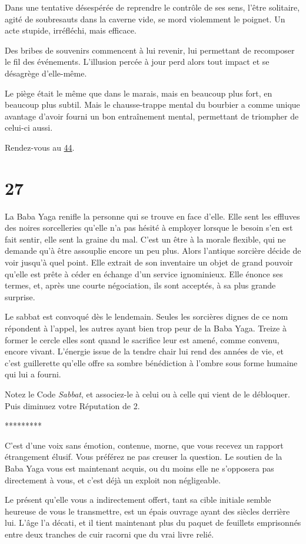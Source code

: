 \documentclass{report}
\newcommand{\gsection}[1]{
    \section{#1}
    \label{section-#1}
}
\newcommand{\glink}[1]{\hyperref[section-#1]{#1}}
\newcommand{\ellipse}{
    \begin{center}
        *********
    \end{center}
}
\begin{document}
Dans une tentative désespérée de reprendre le contrôle de ses sens, l'être solitaire, agité de soubresauts dans la caverne vide, se mord violemment le poignet. Un acte stupide, irréfléchi, mais efficace.

Des bribes de souvenirs commencent à lui revenir, lui permettant de recomposer le fil des événements. L'illusion percée à jour perd alors tout impact et se désagrège d'elle-même.

Le piège était le même que dans le marais, mais en beaucoup plus fort, en beaucoup plus subtil. Mais le chausse-trappe mental du bourbier a comme unique avantage d'avoir fourni un bon entraînement mental, permettant de triompher de celui-ci aussi.

Rendez-vous au \glink{44}.

\gsection{27}

La Baba Yaga renifle la personne qui se trouve en face d'elle. Elle sent les effluves des noires sorcelleries qu'elle n'a pas hésité à employer lorsque le besoin s'en est fait sentir, elle sent la graine du mal. C'est un être à la morale flexible, qui ne demande qu'à être assouplie encore un peu plus. Alors l'antique sorcière décide de voir jusqu'à quel point. Elle extrait de son inventaire un objet de grand pouvoir qu'elle est prête à céder en échange d'un service ignominieux. Elle énonce ses termes, et, après une courte négociation, ils sont acceptés, à sa plus grande surprise.

Le sabbat est convoqué dès le lendemain. Seules les sorcières dignes de ce nom répondent à l'appel, les autres ayant bien trop peur de la Baba Yaga. Treize à former le cercle elles sont quand le sacrifice leur est amené, comme convenu, encore vivant. L'énergie issue de la tendre chair lui rend des années de vie, et c'est guillerette qu'elle offre sa sombre bénédiction à l'ombre sous forme humaine qui lui a fourni.

Notez le Code \emph{Sabbat}, et associez-le à celui ou à celle qui vient de le débloquer. Puis diminuez votre Réputation de 2.

\ellipse

C'est d'une voix sans émotion, contenue, morne, que vous recevez un rapport étrangement élusif. Vous préférez ne pas creuser la question. Le soutien de la Baba Yaga vous est maintenant acquis, ou du moins elle ne s'opposera pas directement à vous, et c'est déjà un exploit non négligeable.

Le présent qu'elle vous a indirectement offert, tant sa cible initiale semble heureuse de vous le transmettre, est un épais ouvrage ayant des siècles derrière lui. L'âge l'a décati, et il tient maintenant plus du paquet de feuillets emprisonnés entre deux tranches de cuir racorni que du vrai livre relié.
\end{document}
